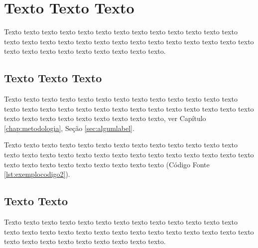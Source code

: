 \chapter{Texto Texto Texto}
\label{chap:capitulo1}

Texto texto texto texto texto texto texto texto texto texto texto texto texto texto texto texto texto texto texto texto texto texto texto texto texto texto texto texto texto texto texto texto texto texto texto texto.



\hfill
\begin{minipage}[t]{.65\textwidth}
\end{minipage}




\section{Texto Texto Texto}
\label{sec:label}
Texto texto texto texto texto texto texto texto texto texto texto texto texto texto texto texto texto texto texto texto texto texto texto texto texto texto texto texto texto texto texto texto texto texto texto texto, ver Capítulo \ref{chap:metodologia}, Seção \ref{sec:algumlabel}.

Texto texto texto texto texto texto texto texto texto texto texto texto texto texto texto texto texto texto texto texto texto texto texto texto texto texto texto texto texto texto texto texto texto texto texto texto (Código Fonte \ref{lst:exemplocodigo2}).


\section{Texto Texto}
\label{sec:outralabel}

Texto texto texto texto texto texto texto texto texto texto texto texto texto texto texto texto texto texto texto texto texto texto texto texto texto texto texto texto texto texto texto texto texto texto texto texto.

